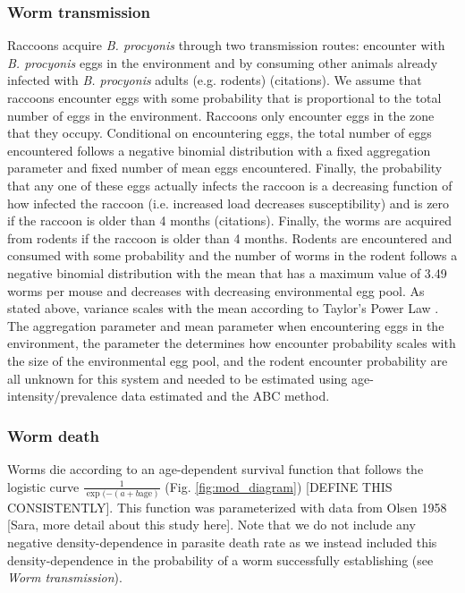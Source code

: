 \documentclass[11pt]{article}
\begin{document}
\subsubsection{Worm transmission}

Raccoons acquire \emph{B. procyonis} through two transmission routes:
encounter with \emph{B. procyonis} eggs in the environment and by
consuming other animals already infected with \emph{B. procyonis} adults
(e.g. rodents) (citations).  We assume that raccoons encounter eggs with some probability that is proportional to the total number of eggs in the environment. Raccoons only encounter eggs in the zone that they occupy. Conditional on encountering eggs, the total number of eggs encountered follows a negative binomial distribution with a fixed aggregation parameter and fixed number of mean eggs encountered.  Finally, the probability that any one of these eggs actually infects the raccoon is a decreasing function of how infected the raccoon (i.e. increased load decreases susceptibility) and is zero if the raccoon is older than 4 months (citations). Finally, the worms are acquired from rodents if the raccoon is older than 4 months.  Rodents are encountered and consumed with some probability and the number of worms in the rodent follows a negative binomial distribution with the mean that has a maximum value of 3.49 worms per mouse and decreases with decreasing environmental egg pool. As stated above, variance scales with the mean according to Taylor's Power Law \citep{Shaw1995}.  The aggregation parameter and mean parameter when encountering eggs in the environment, the parameter the determines how encounter probability scales with the size of the environmental egg pool, and the rodent encounter probability are all unknown for this system and needed to be estimated using age-intensity/prevalence data estimated and the ABC method.

\subsubsection{Worm death}

Worms die according to an age-dependent survival function that follows the logistic curve $\frac{1}{\exp(-(a + b \text{age})}$ (Fig. \ref{fig:mod_diagram}) [DEFINE THIS CONSISTENTLY]. This function was parameterized with data from Olsen 1958 [Sara, more detail about this study here].  Note that we do not include any negative density-dependence in parasite death rate as we instead included this density-dependence in the probability of a worm successfully establishing (see \emph{Worm transmission}).
\end{document}
